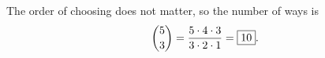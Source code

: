 The order of choosing does not matter, so the number of ways is
\[
\dbinom53=\dfrac{5\cdot4\cdot3}{3\cdot2\cdot1}=\boxed{10}.
\]
